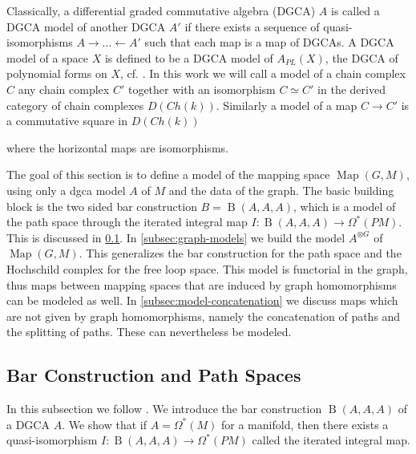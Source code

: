 \documentclass{scrartcl}
\theoremstyle{plain}
\theoremstyle{definition}
\newcommand{\APL}{A_{PL}}
\newcommand{\quiso}{\simeq}
\newcommand{\from}{\leftarrow}
\DeclareMathOperator{\Map}{Map}
\DeclareMathOperator{\BC}{B}
\begin{document}
Classically, a differential graded commutative algebra (DGCA) $A$ is called a DGCA model of another DGCA $A'$ if there exists a sequence of quasi-isomorphisms $A\to\dots\from A'$ such that each map is a map of DGCAs. A DGCA model of a space $X$ is defined to be a DGCA model of $\APL(X)$, the DGCA of polynomial forms on $X$, cf. \cite[Ch. 10]{felix2012rational}. In this work we will call a model of a chain complex $C$ any chain complex $C'$ together with an isomorphism $C\quiso C'$ in the derived category of chain complexes $D(Ch(k))$. Similarly a model of a map $C\to C'$ is a commutative square in $D(Ch(k))$
\begin{center}
\end{center}
where the horizontal maps are isomorphisms. 

The goal of this section is to define a model of the mapping space $\Map(G, M)$, using only a dgca model $A$ of $M$ and the data of the graph. The basic building block is the two sided bar construction $B=\BC(A, A, A)$, which is a model of the path space through the iterated integral map $I\colon \BC(A, A, A)\to\Omega^*(PM)$. This is discussed in \cref{subsec:model-path-space}. In \cref{subsec:graph-models} we build the model $A^{\otimes G}$ of $\Map(G, M)$. This generalizes the bar construction for the path space and the Hochschild complex for the free loop space. This model is functorial in the graph, thus maps between mapping spaces that are induced by graph homomorphisms can be modeled as well. In \cref{subsec:model-concatenation} we discuss maps which are not given by graph homomorphisms, namely the concatenation of paths and the splitting of paths. These can nevertheless be modeled. 


\subsection{Bar Construction and Path Spaces}\label{subsec:model-path-space}

In this subsection we follow \cite{naef2019string}. We introduce the bar construction $\BC(A, A, A)$ of a DGCA $A$. We show that if $A=\Omega^*(M)$ for a manifold, then there exists a quasi-isomorphism $I\colon \BC(A, A, A)\to \Omega^*(PM)$ called the iterated integral map. %
\end{document}
